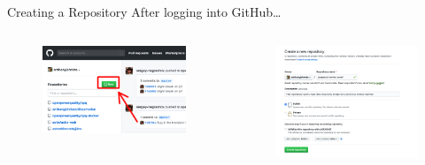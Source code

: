 \documentclass{beamer}
\begin{document}
    \begin{frame}{Creating a Repository}
        After logging into GitHub\ldots
        \begin{columns}
            \begin{figure}
                \centering
                \includegraphics[width=\textwidth]{figures/github_new_1.png}
            \end{figure}

            \begin{figure}
                \centering
                \includegraphics[width=\textwidth]{figures/github_new_2.png}
            \end{figure}

        \end{columns}
    \end{frame}
\end{document}
